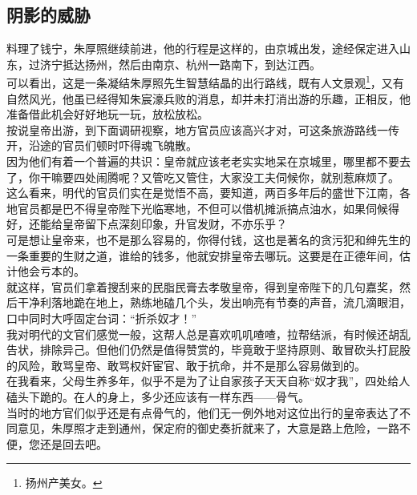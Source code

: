 \begin{multicols}{\theparacolNo}
\subsection{阴影的威胁}
料理了钱宁，朱厚照继续前进，他的行程是这样的，由京城出发，途经保定进入山东，过济宁抵达扬州，然后由南京、杭州一路南下，到达江西。\\

可以看出，这是一条凝结朱厚照先生智慧结晶的出行路线，既有人文景观\footnote{扬州产美女。}，又有自然风光，他虽已经得知朱宸濠兵败的消息，却并未打消出游的乐趣，正相反，他准备借此机会好好地玩一玩，放松放松。\\

按说皇帝出游，到下面调研视察，地方官员应该高兴才对，可这条旅游路线一传开，沿途的官员们顿时吓得魂飞魄散。\\

因为他们有着一个普遍的共识：皇帝就应该老老实实地呆在京城里，哪里都不要去了，你干嘛要四处闹腾呢？又管吃又管住，大家没工夫伺候你，就别惹麻烦了。\\

这么看来，明代的官员们实在是觉悟不高，要知道，两百多年后的盛世下江南，各地官员都是巴不得皇帝陛下光临寒地，不但可以借机摊派搞点油水，如果伺候得好，还能给皇帝留下点深刻印象，升官发财，不亦乐乎？\\

可是想让皇帝来，也不是那么容易的，你得付钱，这也是著名的贪污犯和绅先生的一条重要的生财之道，谁给的钱多，他就安排皇帝去哪玩。这要是在正德年间，估计他会亏本的。\\

就这样，官员们拿着搜刮来的民脂民膏去孝敬皇帝，得到皇帝陛下的几句嘉奖，然后干净利落地跪在地上，熟练地磕几个头，发出响亮有节奏的声音，流几滴眼泪，口中同时大呼固定台词：“折杀奴才！”\\

我对明代的文官们感觉一般，这帮人总是喜欢叽叽喳喳，拉帮结派，有时候还胡乱告状，排除异己。但他们仍然是值得赞赏的，毕竟敢于坚持原则、敢冒砍头打屁股的风险，敢骂皇帝、敢骂权奸宦官、敢于抗命，并不是那么容易做到的。\\

在我看来，父母生养多年，似乎不是为了让自家孩子天天自称“奴才我”，四处给人磕头下跪的。在人的身上，多少还应该有一样东西——骨气。\\

当时的地方官们似乎还是有点骨气的，他们无一例外地对这位出行的皇帝表达了不同意见，朱厚照才走到通州，保定府的御史奏折就来了，大意是路上危险，一路不便，您还是回去吧。\\


\end{multicols}
